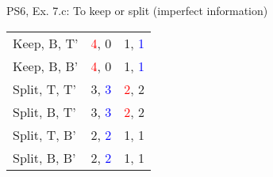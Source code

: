 \begin{frame}{PS6, Ex. 7.c: To keep or split (imperfect information)}
\begin{multicols}{2}
\begin{table}
\begin{tabular}{l|c|c|}
        Keep, B, T' & \textcolor{red}{4}, 0 & 1, \textcolor{blue}{1} \\\cline{2-3}
        Keep, B, B' & \textcolor{red}{4}, 0 & 1, \textcolor{blue}{1} \\\cline{2-3}
        Split, T, T' & 3, \textcolor{blue}{3} & \textcolor{red}{2}, 2 \\\cline{2-3}
        Split, B, T' & 3, \textcolor{blue}{3} & \textcolor{red}{2}, 2 \\\cline{2-3}
        Split, T, B' & 2, \textcolor{blue}{2} & 1, 1 \\\cline{2-3}
        Split, B, B' & 2, \textcolor{blue}{2} & 1, 1 \\\cline{2-3}
      \end{tabular}
    \end{table}
    \vfill\null
  \end{multicols}
\end{frame}





